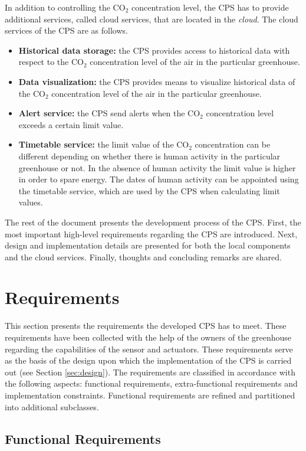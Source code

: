 \documentclass[a4paper, 11pt]{article}
\begin{document}
	In addition to controlling the CO$_2$ concentration level, the CPS has to provide additional services, called cloud services, that are located in the \emph{cloud}. The cloud services of the CPS are as follows. 
	\begin{itemize}
		\item \textbf{Historical data storage:} the CPS provides access to historical data with respect to the CO$_2$ concentration level of the air in the particular greenhouse.
		\item \textbf{Data visualization:} the CPS provides means to visualize historical data of the CO$_2$ concentration level of the air in the particular greenhouse.
		\item \textbf{Alert service:} the CPS send alerts when the CO$_2$ concentration level exceeds a certain limit value.
		\item \textbf{Timetable service:} the limit value of the CO$_2$ concentration can be different depending on whether there is human activity in the particular greenhouse or not. In the absence of human activity the limit value is higher in order to spare energy. The dates of human activity can be appointed using the timetable service, which are used by the CPS when calculating limit values.
	\end{itemize}
	
	The rest of the document presents the development process of the CPS. First, the most important high-level requirements regarding the CPS are introduced. Next, design and implementation details are presented for both the local components and the cloud services. Finally, thoughts and concluding remarks are shared.	
	
	\section{Requirements}
	\label{sec:requirements}
	This section presents the requirements the developed CPS has to meet. These requirements have been collected with the help of the owners of the greenhouse regarding the capabilities of the sensor and actuators. These requirements serve as the basis of the design upon which the implementation of the CPS is carried out (see Section \ref{sec:design}). The requirements are classified in accordance with the following aspects: functional requirements, extra-functional requirements and implementation constraints. Functional requirements are refined and partitioned into additional subclasses.
	
	\subsection{Functional Requirements}
	
\end{document}
